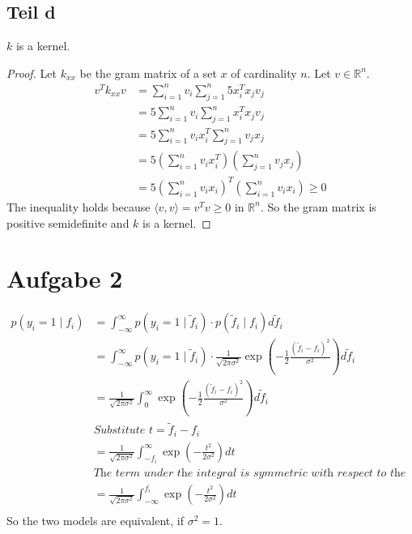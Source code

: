 \documentclass[10pt,a4paper]{article}
\begin{document}
\subsection{Teil d}

$k$ is a kernel.

\begin{proof}
  Let $k_{xx}$ be the gram matrix of a set $x$ of cardinality $n$. Let
  $v \in \mathbb{R}^n$.
  \begin{align*}
    v^T k_{xx} v & = \sum_{i = 1}^n v_i \sum_{j = 1}^n 5x_i^T x_j v_j\\
                 & = 5 \sum_{i = 1}^n v_i \sum_{j = 1}^n x_i^T x_j v_j\\
                 & = 5 \sum_{i = 1}^n v_ix_i^T \sum_{j = 1}^n v_j x_j\\
                 & = 5 \left( \sum_{i = 1}^n v_ix_i^T \right) \left( \sum_{j = 1}^n v_j x_j \right)\\
                 & = 5 \left( \sum_{i = 1}^n v_ix_i \right)^T \left( \sum_{i = 1}^n v_i x_i \right) \ge 0
  \end{align*}
  The inequality holds because $\langle v, v \rangle = v^Tv \ge 0$ in
  $\mathbb{R}^{n}$.  So the gram matrix is positive semidefinite and $k$ is a
  kernel.
\end{proof}

\section{Aufgabe 2}

\begin{align*}
  p(y_{i} = 1 \mid f_{i}) & = \int_{-\infty}^{\infty} p(y_{i} = 1 \mid \tilde{f}_{i}) \cdot p(\tilde{f}_{i} \mid f_{i}) d\tilde{f}_{i}\\
                          & = \int_{-\infty}^{\infty} p(y_{i} = 1 \mid \tilde{f}_{i}) \cdot \frac{1}{\sqrt{2 \pi \sigma^{2}}} \exp\left( -\frac{1}{2} \frac{(\tilde{f}_{i} - f_{i})^{2}}{\sigma^{2}} \right) d\tilde{f}_{i}\\
                          & = \frac{1}{\sqrt{2 \pi \sigma^{2}}} \int_{0}^{\infty} \exp\left( -\frac{1}{2} \frac{(\tilde{f}_{i} - f_{i})^{2}}{\sigma^{2}} \right) d\tilde{f}_{i}\\
                          & \textit{Substitute $t = \tilde{f}_{i} - f_{i}$}\\
                          & = \frac{1}{\sqrt{2 \pi \sigma^{2}}} \int_{-f_{i}}^{\infty} \exp\left( -\frac{t^{2}}{2\sigma^{2}} \right) dt\\
                          & \textit{The term under the integral is symmetric with respect to the origin}\\
                          & = \frac{1}{\sqrt{2 \pi \sigma^{2}}} \int_{-\infty}^{f_{i}} \exp\left( -\frac{t^{2}}{2\sigma^{2}} \right) dt\\
\end{align*}
So the two models are equivalent, if $\sigma^{2} = 1$.
\end{document}

